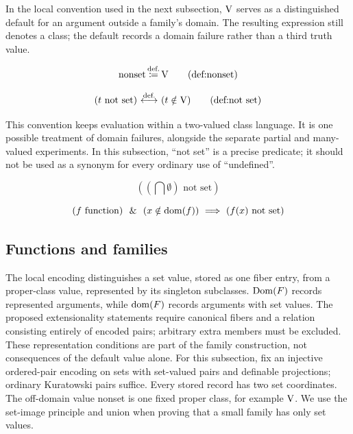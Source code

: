 In the local convention used in the next subsection, $\mathrm{V}$ serves as a distinguished default for an argument outside a family's domain. The resulting expression still denotes a class; the default records a domain failure rather than a third truth value.
\begin{definition}
\[
\text{nonset}\eqdef\V
\clabeltagd{def}{nonset}
\]
\end{definition}
\begin{definition}
\[
(t\text{ not set})\iffdef(t\notin \V)
\clabeltagd{def}{not set}
\]
\end{definition}
This convention keeps evaluation within a two-valued class language. It is one possible treatment of domain failures, alongside the separate partial and many-valued experiments. In this subsection, ``not set'' is a precise predicate; it should not be used as a synonym for every ordinary use of ``undefined''.
\begin{example}
\[
\left(\left(\bigcap \emptyset\right)\text{ not set}\right)
\]
\end{example}
\begin{example}
\[
(f\mathrm{\ function}) \ \ \&\ \  (x\notin \mathrm{dom}(f)) \ \Longrightarrow\  (f(x)\text{ not set})
\]
\end{example}
\pagebreak
\subsection{Functions and families}
The local encoding distinguishes a set value, stored as one fiber entry,
from a proper-class value, represented by its singleton subclasses.
$\mathrm{Dom}(F)$ records represented arguments, while $\mathrm{dom}(F)$ records arguments
with set values. The proposed extensionality statements require canonical
fibers and a relation consisting entirely of encoded pairs; arbitrary extra
members must be excluded. These representation conditions are part of the
family construction, not consequences of the default value alone.
For this subsection, fix an injective ordered-pair encoding on sets with
set-valued pairs and definable projections; ordinary Kuratowski pairs
suffice. Every stored record has two set coordinates. The off-domain
value \textnormal{nonset} is one fixed proper class, for example $\mathrm{V}$.
We use the set-image principle and union when proving that a small family
has only set values.

